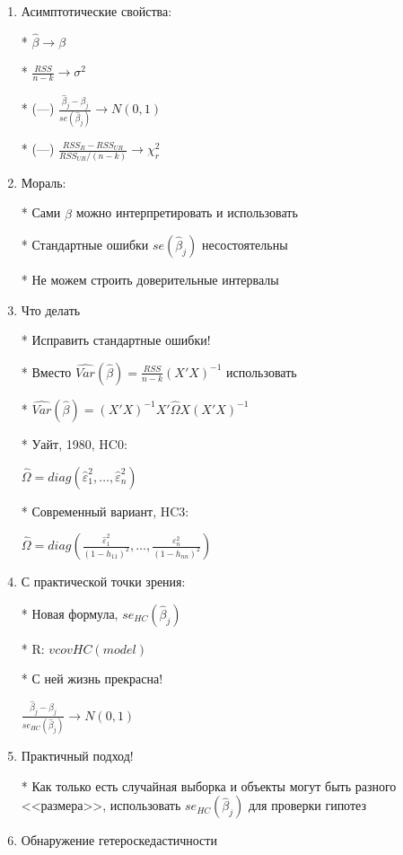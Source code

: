 \documentclass[12pt,a4paper]{article}
\begin{document}
{\begin{enumerate}
* (---) $\frac{(RSS_R-RSS_{UR})/r}{RSS_{UR}/(n-k)} \sim F_{r,n-k}$

\item  Асимптотические свойства:

*  $\hat{\beta} \to \beta $

* $\frac{RSS}{n-k} \to \sigma^2 $

* (---) $\frac{\hat{\beta}_j-\beta_j}{se(\hat{\beta}_j)} \to N(0,1)$

* (---) $\frac{RSS_R-RSS_{UR}}{RSS_{UR}/(n-k)} \to \chi^2_r$

\newpage
\item Мораль:

* Сами $\hat{\beta}$ можно интерпретировать и использовать

* Стандартные ошибки $se(\hat{\beta}_j)$ несостоятельны

* Не можем строить доверительные интервалы

\item Что делать

* Исправить стандартные ошибки! 


* Вместо $\widehat{Var}(\hat{\beta})=\frac{RSS}{n-k}(X'X)^{-1}$ использовать

* $\widehat{Var}(\hat{\beta})=(X'X)^{-1}X'\hat{\Omega}X(X'X)^{-1}$

* Уайт, 1980, HC0: 

$\hat{\Omega}=diag( \hat{\varepsilon}_1^2, \ldots, \hat{\varepsilon}_n^2 )$

* Современный вариант, HC3: 

$\hat{\Omega}=diag( \frac{\hat{\varepsilon}_1^2}{(1-h_{11})^2}, \ldots, \frac{\varepsilon_n^2}{(1-h_{nn})^2} )$

\newpage
\item С практической точки зрения:

* Новая формула, $se_{HC}(\hat{\beta}_j)$

* R: $vcovHC(model)$

* С ней жизнь прекрасна!

$\frac{\hat{\beta}_j-\beta_j}{se_{HC}(\hat{\beta}_j)} \to N(0,1)$

\item Практичный подход!

* Как только есть случайная выборка и объекты могут быть разного <<размера>>, использовать $se_{HC}(\hat{\beta}_j)$ для проверки гипотез

\newpage
\item Обнаружение гетероскедастичности


\end{enumerate}}
\end{document}
